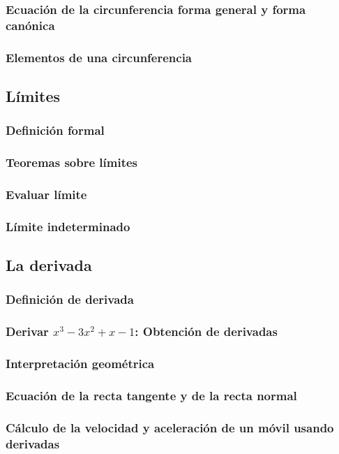\subsubsection{Ecuación de la circunferencia forma general y forma canónica}
\subsubsection{Elementos de una circunferencia}

\subsection{Límites}
\subsubsection{Definición formal}
\subsubsection{Teoremas sobre límites}
\subsubsection{Evaluar límite}
\subsubsection{Límite indeterminado}

\subsection{La derivada}
\subsubsection{Definición de derivada}
\subsubsection{Derivar $x^3 - 3x^2 + x - 1$: Obtención de derivadas}
\subsubsection{Interpretación geométrica}
\subsubsection{Ecuación de la recta tangente y de la recta normal}
\subsubsection{Cálculo de la velocidad y aceleración de un móvil usando derivadas}
